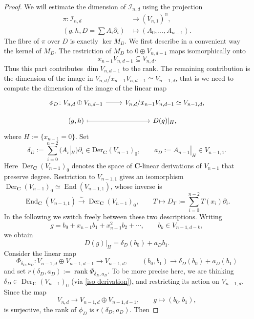 \documentclass[a4paper,12pt,twoside,reqno]{amsart}
\numberwithin{equation}{section}
\theoremstyle{plain}
\theoremstyle{definition}
\DeclareMathOperator{\rank}{rank}
\newcommand{\CC}{\mathbf{C}}
\theoremstyle{plain}
\theoremstyle{definition}
\begin{document}
\begin{proof}
We will estimate the dimension of \(\mathcal I_{n,d}\) using the projection
\[
\begin{aligned}
\pi\colon\mathcal I_{n,d}&\longrightarrow(V_{n,1})^n,\\
(g,h,D=\textstyle\sum A_i\partial_i)&\longmapsto(A_0,\dots,A_{n-1}).
\end{aligned}
\]
The fibre of \(\pi\) over \(D\) is exactly \(\ker M_D\). We first describe in a convenient way the kernel of $M_D$. The restriction of \(M_D\) to \(0\oplus V_{n,d-1}\) maps isomorphically
onto
\[
x_{n-1}V_{n,d-1}\subseteq V_{n,d}.
\]
Thus this part contributes \(\dim V_{n,d-1}\) to the rank. The remaining
contribution is the dimension of the image in $V_{n,d}/x_{n-1}V_{n,d-1} \simeq V_{n-1,d}$, that is we need to compute the dimension of the image of the linear map
\[
\begin{tikzcd}[row sep=small]
\phi_D\colon V_{n,d}\oplus V_{n,d-1}
  \arrow[r]
&V_{n,d}/x_{n-1}V_{n,d-1}\simeq V_{n-1,d},\\
(g,h)\arrow[r,mapsto]
&D(g)|_H,
\end{tikzcd}
\]
where $H:=\{x_{n-1}=0\}$.
 Set
\[
\delta_D:=
\sum_{i=0}^{n-2}(A_i|_H)\partial_i
\in \operatorname{Der_{\CC}{}}(V_{n-1})_0,
\qquad
a_D:=A_{n-1}|_H\in V_{n-1,1}.
\]
Here $\operatorname{Der}_{\CC}(V_{n-1})_0$ denotes the space of $\CC$-linear derivations of $V_{n-1}$ that preserve degree. Restriction to $V_{n-1,1}$ gives an isomorphism $\operatorname{Der}_{\CC}(V_{n-1})_0\simeq\operatorname{End}(V_{n-1,1})$, whose inverse is
\begin{equation}
\label{iso derivation}
\operatorname{End}_{\CC}(V_{n-1,1})
\xrightarrow{\sim}
\operatorname{Der}_{\CC}(V_{n-1})_0,
\qquad
T\longmapsto
D_T:=\sum_{i=0}^{n-2}T(x_i)\partial_i.
\end{equation}
In the following we switch freely between these two descriptions. Writing
\[
g=b_0+x_{n-1}b_1+x_{n-1}^2b_2+\cdots,
\qquad
b_k\in V_{n-1,d-k},
\]
we obtain
\[
D(g)|_H=\delta_D(b_0)+a_Db_1.
\]
Consider the linear map
\[
\Phi_{\delta_D,a_D}\colon V_{n-1,d} \oplus V_{n-1,d-1}  \rightarrow V_{n-1,d}, \quad  \quad (b_0,b_1) \rightarrow \delta_D(b_0) 
 +a_D(b_1)
\]
and set $r(\delta_D,a_D):=\rank\Phi_{\delta_D,a_D}$. To be more precise here, we are thinking $\delta_D \in \operatorname{Der}_{\CC}(V_{n-1})_0$ (via \eqref{iso derivation}), and restricting its action on $V_{n-1,d}$. Since the map
\[
V_{n,d}\longrightarrow V_{n-1,d}\oplus V_{n-1,d-1},
\qquad
g\longmapsto(b_0,b_1),
\]
is surjective, the rank of $\phi_D$ is \(r(\delta_D,a_D)\). Then

\end{proof}
\end{document}
